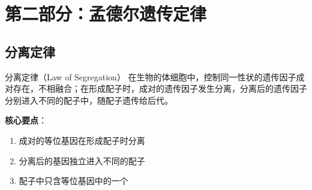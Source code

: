 \documentclass[a4paper,11pt]{ctexart}
\begin{document}

\section{第二部分：孟德尔遗传定律}

\subsection{分离定律}

\begin{theorembox}{分离定律（Law of Segregation）}
在生物的体细胞中，控制同一性状的遗传因子成对存在，不相融合；在形成配子时，成对的遗传因子发生分离，分离后的遗传因子分别进入不同的配子中，随配子遗传给后代。

\textbf{核心要点}：
\begin{enumerate}[leftmargin=2em]
    \item 成对的等位基因在形成配子时分离
    \item 分离后的基因独立进入不同的配子
    \item 配子中只含等位基因中的一个
\end{enumerate}
\end{theorembox}
\end{document}
